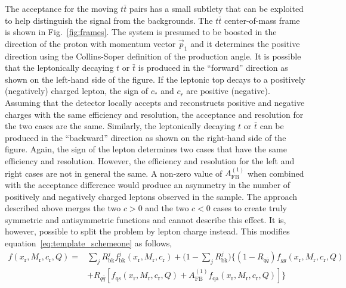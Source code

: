 The acceptance for the moving $t\bar t$ pairs has a small subtlety that can be exploited to help distinguish the signal from the backgrounds.  The $t\bar t$ center-of-mass frame is shown in Fig.~\ref{fig:frames}.  The system is presumed to be boosted in the direction of the proton with momentum vector $\vec p_1$ and it determines the positive direction using the Collins-Soper definition of the production angle.  It is possible that the leptonically decaying $t$ or $\bar t$ is produced in the ``forward'' direction as shown on the left-hand side of the figure.  If the leptonic top decays to a positively (negatively) charged lepton, the sign of $c_*$ and $c_r$ are positive (negative).  Assuming that the detector locally accepts and reconstructs positive and negative charges with the same efficiency and resolution, the acceptance and resolution for the two cases are the same.  Similarly, the leptonically decaying $t$ or $\bar t$ can be produced in the ``backward'' direction as shown on the right-hand side of the figure.  Again, the sign of the lepton determines two cases that have the same efficiency and resolution.  However, the efficiency and resolution for the left and right cases are not in general the same.  A non-zero value of $A_\mathrm{FB}^{(1)}$ when combined with the acceptance difference would produce an asymmetry in the number of positively and negatively charged leptons observed in the sample.  The approach described above merges the two $c>0$ and the two $c<0$ cases to create truly symmetric and antisymmetric functions and cannot describe this effect.  It is, however, possible to split the problem by lepton charge instead.  This modifies equation~\ref{eq:template_schemeone} as follows,
\begin{align}
f(x_\mathrm{r},M_\mathrm{r},c_\mathrm{r},Q) =&  \sum_jR^j_\mathrm{bk}f^j_\mathrm{bk}(x_\mathrm{r},M_\mathrm{r},c_\mathrm{r})+\biggl(1-\sum_jR^j_\mathrm{bk}\biggr )\biggl\lbrace \left(1-R_{q\bar q}\right) f_{gg}(x_\mathrm{r},M_\mathrm{r},c_\mathrm{r},Q)\nonumber \\ &+R_{q\bar q}\left[f_\mathrm{qs}(x_\mathrm{r}, M_\mathrm{r}, c_\mathrm{r},Q)+A_\mathrm{FB}^{(1)}f_\mathrm{qa}(x_\mathrm{r}, M_\mathrm{r}, c_\mathrm{r},Q)\right]\biggr\rbrace
\label{eq:template_schemetwo}
\end{align}
